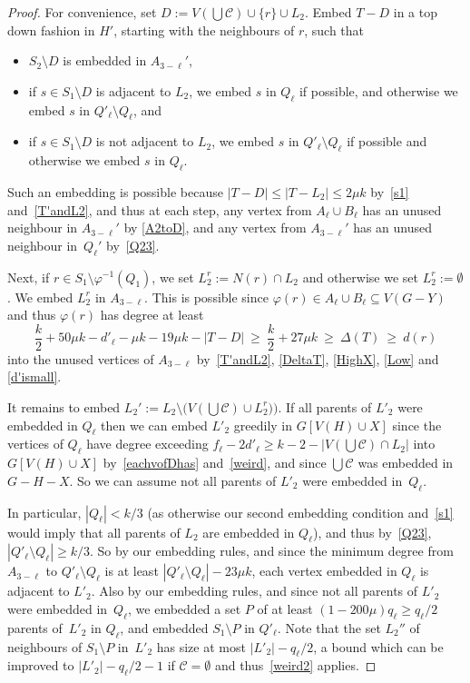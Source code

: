 \documentclass[12pt]{article}
\begin{document}
  \begin{proof}
 For convenience, set 
 $D:=V(\bigcup\mathcal C)\cup \{r\}\cup L_2$.
 Embed $T-D$ in a top down fashion in $H'$, starting with the neighbours of $r$, such that
 \begin{itemize}
     \item  $S_2\setminus D$ is embedded in $A_{3-\ell}'$,
     \item if $s\in S_1\setminus D$ is adjacent to $L_2$, we embed $s$ in $Q_\ell$ if possible, and otherwise we embed $s$ in $Q'_\ell\setminus Q_\ell$, and
     \item if $s\in S_1\setminus D$ is not adjacent to $L_2$, we embed $s$   in $Q'_\ell\setminus Q_\ell$ if possible and otherwise we embed $s$ in $Q_\ell$. 
 \end{itemize}
 Such an embedding is possible because $|T-D|\le |T-L_2|\le 2\mu k$ by~\eqref{s1} and~\eqref{T'andL2}, and thus at each step, any vertex from $A_\ell\cup B_\ell$ has an unused neighbour in $A_{3-\ell}'$ by \eqref{A2toD}, and  any vertex  from  $A_{3-\ell}'$ has an unused neighbour in~$Q_\ell'$ by~\eqref{Q23}.
 
Next, if $r\in S_1\setminus\varphi^{-1}( Q_1)$, we  set $L_2^r:=N(r)\cap L_2$ and otherwise we set $L_2^r:=\emptyset$. 
We embed $L_2^r$ in $A_{3-\ell}$. This is possible since $\varphi (r)\in A_\ell\cup B_\ell\subseteq V(G-Y)$ and thus $\varphi (r)$ has degree at least $$\frac k2+50\mu k-d'_\ell-\mu k-19\mu k- |T-D|\ \ge\ \frac k2+27\mu k\ \ge\ \Delta(T)\ \ge\ d(r)$$ into the unused vertices of $A_{3-\ell}$ by~\eqref{T'andL2}, \eqref{DeltaT}, \eqref{HighX}, \eqref{Low} and \eqref{d'ismall}.
 

 It remains to embed $L_2':=L_2\setminus \big(V(\bigcup\mathcal C)\cup L_2^r)\big)$.
If  all parents of $L'_2$ were embedded  in $Q_\ell$ then
we can embed  $L'_2$ greedily in $G[V(H)\cup X]$  since the vertices of $Q_\ell$ have degree exceeding $f_\ell-2d'_\ell\ge k-2-|V(\bigcup\mathcal C)\cap L_2|$ into $G[V(H)\cup X]$ by~\eqref{eachvofDhas} and~\eqref{weird}, and since $\bigcup\mathcal C$ was embedded in $G-H-X$. So we can assume not all parents of $L'_2$ were embedded  in~$Q_\ell$.

In particular, $|Q_\ell|< k/3$ (as otherwise our second embedding condition and~\eqref{s1} would imply that all parents of $L_2$ are embedded in $Q_\ell$), and thus by~\eqref{Q23}, $|Q'_\ell\setminus Q_\ell|\ge k/3$. So
by our embedding rules,  and since the minimum degree from $A_{3-\ell}$ to $Q'_\ell\setminus Q_\ell$ is at least $|Q'_\ell\setminus Q_\ell|-23\mu k$, each vertex embedded in $Q_\ell$ is adjacent to $L'_2$. Also by our embedding rules, and since not all parents of $L'_2$ were embedded  in~$Q_\ell$,
 we embedded a set $P$ of at least $(1-200 \mu)q_\ell\ge q_\ell/2$ parents of~$L'_2$ in $Q_\ell$, and embedded  $S_1\setminus P$ in   $Q'_\ell$. Note that the set $L_2''$ of  neighbours  of $S_1\setminus P$  in~$L'_2$
has size at most $|L'_2|-q_\ell/2$, a bound which can be improved to $|L'_2|-q_\ell/2-1$ if $\mathcal C=\emptyset$ and thus~\eqref{weird2} applies. %


\end{proof}
\end{document}
